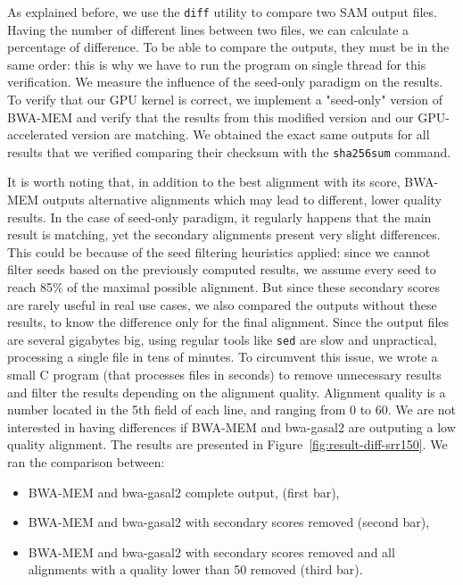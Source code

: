 
As explained before, we use the \verb|diff| utility to compare two SAM output files. Having the number of different lines between two files, we can calculate a percentage of difference. To be able to compare the outputs, they must be in the same order: this is why we have to run the program on single thread for this verification. We measure the influence of the seed-only paradigm on the results. To verify that our GPU kernel is correct, we implement a "seed-only" version of BWA-MEM and verify that the results from this modified version and our GPU-accelerated version are matching. We obtained the exact same outputs for all results that we verified comparing their checksum with the \verb|sha256sum| command.

It is worth noting that, in addition to the best alignment with its score, BWA-MEM outputs alternative alignments which may lead to different, lower quality results. In the case of seed-only paradigm, it regularly happens that the main result is matching, yet the secondary alignments present very slight differences. This could be because of the seed filtering heuristics applied: since we cannot filter seeds based on the previously computed results, we assume every seed to reach 85\% of the maximal possible alignment. But since these secondary scores are rarely useful in real use cases, we also compared the outputs without these results, to know the difference only for the final alignment. Since the output files are several gigabytes big, using regular tools like \verb|sed| are slow and unpractical, processing a single file in tens of minutes. To circumvent this issue, we wrote a small C program (that processes files in seconds) to remove unnecessary results and filter the results depending on the alignment quality. Alignment quality is a number located in the 5th field of each line, and ranging from 0 to 60. We are not interested in having differences if BWA-MEM and bwa-gasal2 are outputing a low quality alignment. The results are presented in Figure~\ref{fig:result-diff-srr150}. We ran the comparison between:
\begin{itemize}
    \item BWA-MEM and bwa-gasal2 complete output, (first bar),
    \item BWA-MEM and bwa-gasal2 with secondary scores removed (second bar),
    \item BWA-MEM and bwa-gasal2 with secondary scores removed and all alignments with a quality lower than 50 removed (third bar).
\end{itemize}{}


